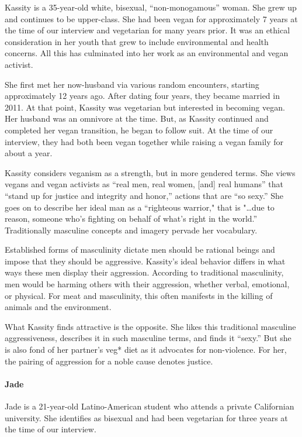 \documentclass[twoside]{report}
\begin{document}
Kassity is a 35-year-old white, bisexual, ``non-monogamous'' woman. She
grew up and continues to be upper-class. She had been vegan for
approximately 7 years at the time of our interview and vegetarian for
many years prior. It was an ethical consideration in her youth that grew
to include environmental and health concerns. All this has culminated
into her work as an environmental and vegan activist.

She first met her now-husband via various random encounters, starting
approximately 12 years ago. After dating four years, they became married
in 2011. At that point, Kassity was vegetarian but interested in
becoming vegan. Her husband was an omnivore at the time. But, as Kassity
continued and completed her vegan transition, he began to follow suit.
At the time of our interview, they had both been vegan together while
raising a vegan family for about a year.

Kassity considers veganism as a strength, but in more gendered terms. She views vegans and vegan activists as ``real men, real women, {[}and{]} real humans'' that ``stand up for justice and integrity and honor,'' actions that are ``so sexy.'' She goes on to describe her ideal man as a ``righteous warrior," that is "\ldots due to reason, someone who's fighting on behalf of
what's right in the world.'' Traditionally masculine concepts and imagery pervade her vocabulary. 

Established forms of masculinity dictate men should be rational beings and impose that they should be aggressive. Kassity's ideal behavior differs in what ways these men display their aggression. According to traditional masculinity, men would be harming others with their aggression, whether verbal, emotional, or physical. For meat and masculinity, this often manifests in the killing of animals and the environment.

What Kassity finds attractive is the opposite. She likes this
traditional masculine aggressiveness, describes it in such masculine
terms, and finds it ``sexy.'' But she is also fond of her partner's veg* diet as it advocates for non-violence. For her, the pairing of aggression for a noble cause denotes justice.
%
\paragraph{Jade}

Jade is a 21-year-old Latino-American student who attends a private
Californian university. She identifies as bisexual and had been
vegetarian for three years at the time of our interview. 
\end{document}
